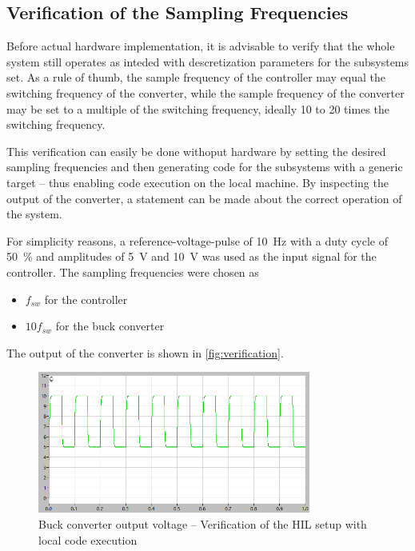 \subsection{Verification of the Sampling Frequencies}
\label{subsection:sampling_frequencies}

Before actual hardware implementation, it is advisable to verify that the whole system still operates as inteded with descretization parameters for the subsystems set.
As a rule of thumb, the sample frequency of the controller may equal the switching frequency of the converter, while the sample frequency of the converter may be set to a multiple of the switching frequency, ideally 10 to 20 times the switching frequency.

This verification can easily be done withoput hardware by setting the desired sampling frequencies and then generating code for the subsystems with a generic target -- thus enabling code execution on the local machine. By inspecting the output of the converter, a statement can be made about the correct operation of the system.

For simplicity reasons, a reference-voltage-pulse of \qty{10}{\hertz} with a duty cycle of \qty{50}{\percent} and amplitudes of \qty{5}{\volt} and \qty{10}{\volt} was used as the input signal for the controller.
The sampling frequencies were chosen as
\begin{itemize}
    \item $f_{sw}$ for the controller
    \item $10f_{sw}$ for the buck converter
\end{itemize}
The output of the converter is shown in \autoref{fig:verification}.
\begin{figure}[htbp]
    \centering
        \includegraphics[width=0.8\textwidth]{img/HIL/generic_v_out.png}
    \caption{Buck converter output voltage -- Verification of the HIL setup with local code execution}
    \label{fig:verification}
\end{figure}

